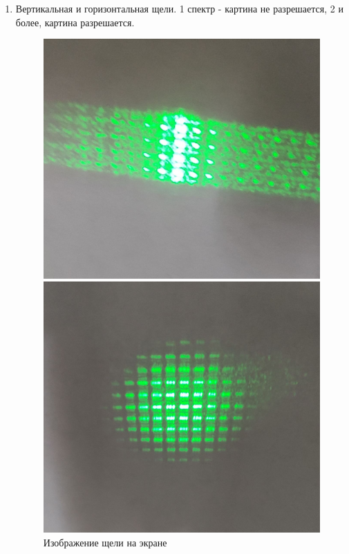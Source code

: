 \documentclass[a4paper, 12pt]{article}%
\begin{document}
\begin{enumerate}

\item Вертикальная и горизонтальная щели. 1 спектр - картина не разрешается, 2 и более, картина разрешается.

\begin{figure}[h!]
        \begin{center}
            \begin{minipage}[h!]{0.48\linewidth}
                \includegraphics[width=1\linewidth]{images/img_3.jpg}
                \caption{Изображение щели на экране}
                \label{picture_2}
            \end{minipage}
            \hfill
            \begin{minipage}[h!]{0.48\linewidth}
                \includegraphics[width=1\linewidth]{images/img_2.jpg}

\end{minipage}
\end{center}
\end{figure}
\end{enumerate}
\end{document}
